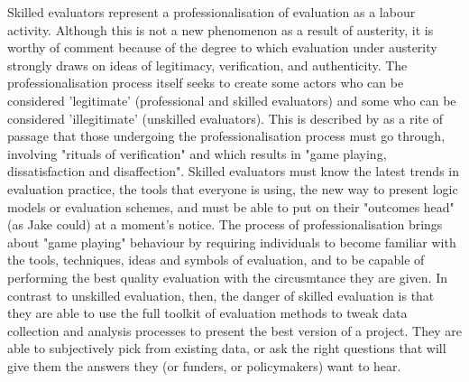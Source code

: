 Skilled evaluators represent a professionalisation of evaluation as a labour activity. Although this is not a new phenomenon as a result of austerity, it is worthy of comment because of the degree to which evaluation under austerity strongly draws on ideas of legitimacy, verification, and authenticity. The professionalisation process itself seeks to create some actors who can be considered 'legitimate' (professional and skilled evaluators) and some who can be considered 'illegitimate' (unskilled evaluators). This is described by \citet[796]{oconnell_paperwork_2011} as a rite of passage that those undergoing the professionalisation process must go through, involving "rituals of verification" and which results in "game playing, dissatisfaction and disaffection". Skilled evaluators must know the latest trends in evaluation practice, the tools that everyone is using, the new way to present logic models or evaluation schemes, and must be able to put on their "outcomes head" (as Jake could) at a moment's notice. The process of professionalisation brings about "game playing" behaviour by requiring individuals to become familiar with the tools, techniques, ideas and symbols of evaluation, and to be capable of performing the best quality evaluation with the circusmtance they are given. In contrast to unskilled evaluation, then, the danger of skilled evaluation is that they are able to use the full toolkit of evaluation methods to tweak data collection and analysis processes to present the best version of a project. They are able to subjectively pick from existing data, or ask the right questions that will give them the answers they (or funders, or policymakers) want to hear.

